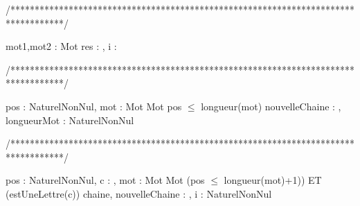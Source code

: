 /***********************************************************************************/
\begin{algorithme}
     {mot1,mot2 : Mot}%
     {\booleen}%
     {res : \booleen, i : \entier }%
     {
                  {
                  }%
                  {
                    {
                       {
                       }
                       
                       
                    }
                   }%
      
      }
\end{algorithme}

/***********************************************************************************/
\begin{algorithme}
       {pos : NaturelNonNul, mot : Mot}
       {Mot}
       {pos $\leq$ longueur(mot)}
       {nouvelleChaine : \chaine, longueurMot : NaturelNonNul}
       {
             {
             }
        }
       
\end{algorithme}

/***********************************************************************************/
\begin{algorithme}
       {pos : NaturelNonNul, c : \caractere, mot : Mot}%
       {Mot}%
       {(pos $\leq$ longueur(mot)+1)) ET (estUneLettre(c))}%
       {chaine, nouvelleChaine : \chaine, i : NaturelNonNul}
       {
            {
            }

            
       }
\end{algorithme}

